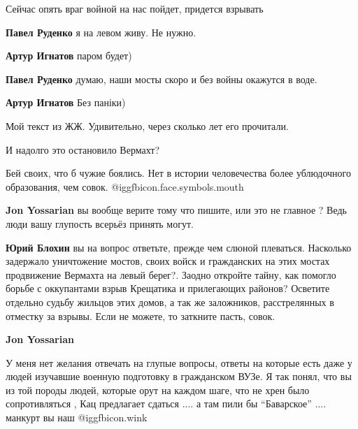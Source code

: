  
 
 
 
 
\zzSecCmt

\begin{itemize} %
Сейчас опять враг войной на нас пойдет, придется взрывать

\begin{itemize} %
\textbf{Павел Руденко} я на левом живу. Не нужно.

\textbf{Артур Игнатов} паром будет)

\textbf{Павел Руденко} думаю, наши мосты скоро и без войны окажутся в воде.

\textbf{Артур Игнатов} Без паніки)
\end{itemize} %

Мой текст из ЖЖ. Удивительно, через сколько лет его прочитали.


И надолго это остановило Вермахт?

Бей своих, что б чужие боялись. Нет в истории человечества более ублюдочного
образования, чем совок. @igg{fbicon.face.symbols.mouth} 

\begin{itemize} %
\textbf{Jon Yossarian} вы вообще верите тому что пишите, или это не главное ? Ведь люди вашу глупость всерьёз принять могут.

\textbf{Юрий Блохин} вы на вопрос ответьте, прежде чем слюной плеваться.
Насколько задержало уничтожение мостов, своих войск и гражданских на этих мостах продвижение Вермахта на левый берег?.
Заодно откройте тайну, как помогло борьбе с оккупантами взрыв Крещатика и прилегающих районов? Осветите отдельно судьбу жильцов этих домов, а так же заложников, расстрелянных в отместку за взрывы.
Если не можете, то заткните пасть, совок.

\textbf{Jon Yossarian} 

У меня нет желания отвечать на глупые вопросы, ответы на которые есть даже у
людей изучавшие военную подготовку в гражданском ВУЗе. Я так понял, что вы из
той породы людей, которые орут на каждом шаге, что не хрен было сопротивляться
, Кац предлагает сдаться .... а там пили бы \enquote{Баварское} .... манкурт вы наш  @igg{fbicon.wink} 



\end{itemize}
\end{itemize}
